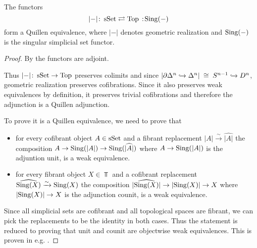 \begin{prop}\label{prop:quillenEqSSetTop}
    The functors
    \begin{equation*}
        \lvert-\rvert\colon\sSet\rightleftarrows\Top\mkern+3mu:\mkern-3mu\Sing(-)
    \end{equation*}
    form a Quillen equivalence, where $\lvert-\rvert$ denotes geometric realization and $\operatorname{Sing}(-)$ is the singular simplicial set functor.
    \begin{proof}
        By \cite[Corollary 1.1.8.5]{kerodon} the functors are adjoint.

        Thus $\lvert-\rvert\colon\operatorname{sSet}\to\operatorname{Top}$ preserves colimits and since $\lvert\partial\Delta^n\xhookrightarrow{}\Delta^n\rvert\;\cong\;S^{n-1}\xhookrightarrow{} D^n$, geometric realization preserves cofibrations.
        Since it also preserves weak equivalences by definition, it preserves trivial cofibrations and therefore the adjunction is a Quillen adjunction.

        To prove it is a Quillen equivalence, we need to prove that 
        \begin{itemize}
            \item for every cofibrant object $A\in\operatorname{sSet}$ and a fibrant replacement $\lvert A\rvert\xrightarrow{\sim}\widehat{\lvert A\rvert}$ the composition $A\to\operatorname{Sing}(\lvert A\rvert)\to\operatorname{Sing}(\widehat{\lvert A\rvert})$ where $A\to\operatorname{Sing}(\lvert A\rvert)$ is the adjuntion unit, is a weak equivalence.
            \item for every fibrant object $X\in\Top$ and a cofibrant replacement $\widehat{\operatorname{Sing}(X)}\xrightarrow{\sim}\operatorname{Sing}(X)$ the composition $\lvert\widehat{\operatorname{Sing}(X)}\rvert\to\lvert\operatorname{Sing}(X)\rvert\to X$ where $\lvert\operatorname{Sing}(X)\rvert\to X$ is the adjunction counit, is a weak equivalence.
        \end{itemize}
        Since all simplicial sets are cofibrant and all topological spaces are fibrant, we can pick the replacements to be the identity in both cases.
        Thus the statement is reduced to proving that unit and counit are objectwise weak equivalences. 
        This is proven in e.g. \cite[Theorem 3.5.4.1 and Corollary 3.5.4.2]{kerodon}.
    \end{proof}
\end{prop}
